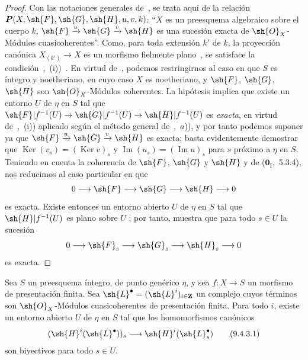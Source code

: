 \begin{proof}
Con las notaciones generales de~, se trata aquí de la relación $\boldsymbol{P}(X,\sh{F},\sh{G},\sh{H},u,v,k)$: ``$X$ es un preesquema algebraico sobre el cuerpo $k$, $\sh{F}\xrightarrow{u}\sh{G}\xrightarrow{v}\sh{H}$ es una sucesión exacta de $\sh{O}_X$-Módulos cuasicoherentes''.
Como, para toda extensión $k'$ de $k$, la proyección canónica $X_{(k')}\to X$ es un morfismo fielmente plano~, se satisface la condición~,~(i))~.
En virtud de~, podemos restringirnos al caso en que $S$ es íntegro y noetheriano, en cuyo caso $X$ es noetheriano, y $\sh{F}$, $\sh{G}$, $\sh{H}$ son $\sh{O}_X$-Módulos coherentes.
La hipótesis implica que existe un entorno $U$ de $\eta$ en $S$ tal que $\sh{F}|f^{-1}(U)\to\sh{G}|f^{-1}(U)\to\sh{H}|f^{-1}(U)$ es \emph{exacta}, en virtud de~,~(i)) aplicado según el método general de~,~$a$)), y por tanto podemos suponer ya que $\sh{F}\xrightarrow{u}\sh{G}\xrightarrow{v}\sh{H}$ es exacta; basta evidentemente demostrar que $\operatorname{Ker}(v_s)=(\operatorname{Ker} v)_s$ y $\operatorname{Im}(u_s)=(\operatorname{Im} u)_s$ para $s$ próximo a $\eta$ en $S$.
Teniendo en cuenta la coherencia de $\sh{F}$, $\sh{G}$ y $\sh{H}$ y de
($\mathbf{0}_{\mathrm{I}}$,~5.3.4), nos reducimos al caso particular en que
\[
 0\longrightarrow\sh{F}\longrightarrow\sh{G}\longrightarrow\sh{H}
 \longrightarrow0
\]
es exacta.
Existe entonces un entorno abierto $U$ de $\eta$ en $S$ tal que
$\sh{H}|f^{-1}(U)$ es plano sobre $U$ ; por tanto, 
muestra que para todo $s\in U$ la sucesión
\[
 0\longrightarrow\sh{F}_s\longrightarrow\sh{G}_s\longrightarrow\sh{H}_s
 \longrightarrow0
\]
es exacta.
\end{proof}

\begin{corollary}[9.4.3]
\label{IV.9.4.3}
Sea $S$ un preesquema íntegro, de punto genérico $\eta$, y sea $f:X\to S$ un morfismo de presentación finita.
Sea $\sh{L}^\bullet=(\sh{L}^i)_{i\in\mathbf{Z}}$ un complejo cuyos términos son $\sh{O}_X$-Módulos cuasicoherentes de presentación finita.
Para todo $i$, existe un entorno abierto $U$ de $\eta$ en $S$ tal que los homomorfismos canónicos
\begin{equation}
\label{IV.9.4.3.1}
  (\sh{H}^i(\sh{L}^\bullet))_s\to\sh{H}^i(\sh{L}^\bullet_s) \tag{9.4.3.1}
\end{equation}
son biyectivos para todo $s\in U$.
\end{corollary}

